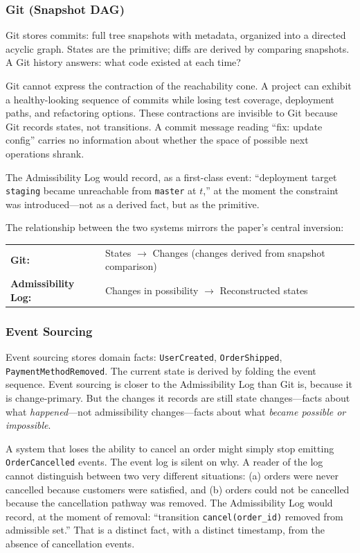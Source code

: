 \documentclass[12pt, a4paper]{article}
\theoremstyle{plain}
\theoremstyle{definition}
\theoremstyle{remark}
\begin{document}
\subsubsection{Git (Snapshot DAG)}

Git stores commits: full tree snapshots with metadata, organized into a
directed acyclic graph. States are the primitive; diffs are derived by
comparing snapshots. A Git history answers: what code existed at each time?

Git cannot express the contraction of the reachability cone. A project can
exhibit a healthy-looking sequence of commits while losing test coverage,
deployment paths, and refactoring options. These contractions are invisible
to Git because Git records states, not transitions. A commit message reading
``fix: update config'' carries no information about whether the space of
possible next operations shrank.

The Admissibility Log would record, as a first-class event: ``deployment
target \texttt{staging} became unreachable from \texttt{master} at $t$,''
at the moment the constraint was introduced---not as a derived fact, but as
the primitive.

The relationship between the two systems mirrors the paper's central inversion:

\begin{center}
\begin{tabular}{ll}
\textbf{Git:} & States $\to$ Changes (changes derived from snapshot comparison) \\
\textbf{Admissibility Log:} & Changes in possibility $\to$ Reconstructed states \\
\end{tabular}
\end{center}

\subsubsection{Event Sourcing}

Event sourcing stores domain facts: \texttt{UserCreated}, \texttt{OrderShipped},
\texttt{PaymentMethodRemoved}. The current state is derived by folding the
event sequence. Event sourcing is closer to the Admissibility Log than Git is,
because it is change-primary. But the changes it records are still state
changes---facts about what \emph{happened}---not admissibility changes---facts
about what \emph{became possible or impossible}.

A system that loses the ability to cancel an order might simply stop emitting
\texttt{OrderCancelled} events. The event log is silent on why. A reader of
the log cannot distinguish between two very different situations: (a) orders
were never cancelled because customers were satisfied, and (b) orders could not
be cancelled because the cancellation pathway was removed. The Admissibility
Log would record, at the moment of removal: ``transition \texttt{cancel(order\_id)}
removed from admissible set.'' That is a distinct fact, with a distinct
timestamp, from the absence of cancellation events.
\end{document}
